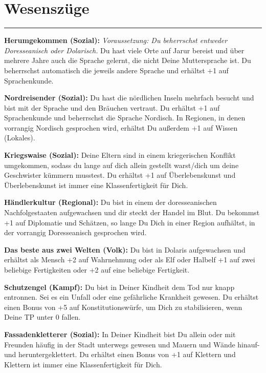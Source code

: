 \documentclass[
	ngerman,
	a4paper,
	11pt,
	twocolumn,
]{scrartcl}
\begin{document}
\section*{Wesenszüge}

\rule[2ex]{0.49\textwidth}{1pt}


\textbf{Herumgekommen (Sozial):} \textit{Voraussetzung: Du beherrschst entweder Doresseanisch oder Dolarisch.} Du hast viele Orte auf Jarur bereist und über mehrere Jahre auch die Sprache gelernt, die nicht Deine Muttersprache ist. Du beherrschst automatisch die jeweils andere Sprache und erhältst +1 auf Sprachenkunde.

\textbf{Nordreisender (Sozial):} Du hast die nördlichen Inseln mehrfach besucht und bist mit der Sprache und den Bräuchen vertraut. Du erhältst +1 auf Sprachenkunde und beherrschst die Sprache Nordisch. In Regionen, in denen vorrangig Nordisch gesprochen wird, erhältst Du außerdem +1 auf Wissen (Lokales).

\textbf{Kriegswaise (Sozial):} Deine Eltern sind in einem kriegerischen Konflikt umgekommen, sodass du lange auf dich allein gestellt warst/dich um deine Geschwister kümmern musstest. Du erhältst +1 auf Überlebenskunst und Überlebenskunst ist immer eine Klassenfertigkeit für Dich.

\textbf{Händlerkultur (Regional):} Du bist in einem der doresseanischen Nachfolgestaaten aufgewachsen und dir steckt der Handel im Blut. Du bekommst +1 auf Diplomatie und Schätzen, so lange Du Dich in einer Region aufhältst, in der vorrangig Doresseanisch gesprochen wird.

\textbf{Das beste aus zwei Welten (Volk):} Du bist in Dolaris aufgewachsen und erhältst als Mensch +2 auf Wahrnehmung oder als Elf oder Halbelf +1 auf zwei beliebige Fertigkeiten oder +2 auf eine beliebige Fertigkeit.

\textbf{Schutzengel (Kampf):} Du bist in Deiner Kindheit dem Tod nur knapp entronnen. Sei es ein Unfall oder eine gefährliche Krankheit gewesen. Du erhältst einen Bonus von +5 auf Konstitutionswürfe, um Dich zu stabilisieren, wenn Deine TP unter 0 fallen.

\textbf{Fassadenkletterer (Sozial):} In Deiner Kindheit bist Du allein oder mit Freunden häufig in der Stadt unterwegs gewesen und Mauern und Wände hinauf- und heruntergeklettert. Du erhältst einen Bonus von +1 auf Klettern und Klettern ist immer eine Klassenfertigkeit für Dich.
\end{document}
